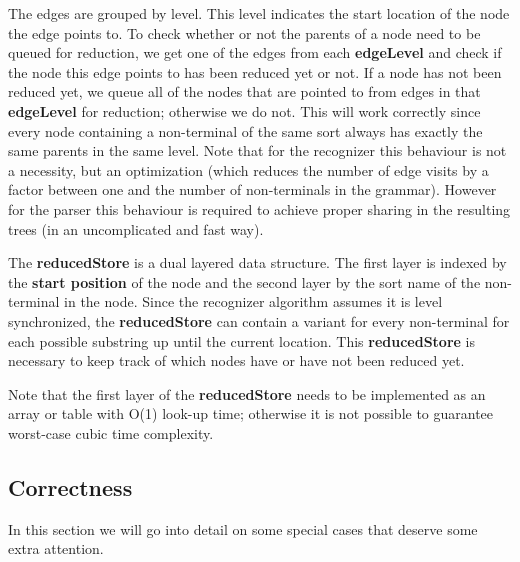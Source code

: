 \documentclass[a4paper,10pt]{article}
\begin{document}
The edges are grouped by level. This level indicates the start location of the node the edge points to. To check whether or not the parents of a node need to be queued for reduction, we get one of the edges from each {\bf edgeLevel} and check if the node this edge points to has been reduced yet or not. If a node has not been reduced yet, we queue all of the nodes that are pointed to from edges in that {\bf edgeLevel} for reduction; otherwise we do not. This will work correctly since every node containing a non-terminal of the same sort always has exactly the same parents in the same level. Note that for the recognizer this behaviour is not a necessity, but an optimization (which reduces the number of edge visits by a factor between one and the number of non-terminals in the grammar). However for the parser this behaviour is required to achieve proper sharing in the resulting trees (in an uncomplicated and fast way).

The {\bf reducedStore} is a dual layered data structure. The first layer is indexed by the {\bf start position} of the node and the second layer by the sort name of the non-terminal in the node. Since the recognizer algorithm assumes it is level synchronized, the {\bf reducedStore} can contain a variant for every non-terminal for each possible substring up until the current location. This {\bf reducedStore} is necessary to keep track of which nodes have or have not been reduced yet.

Note that the first layer of the {\bf reducedStore} needs to be implemented as an array or table with O(1) look-up time; otherwise it is not possible to guarantee worst-case cubic time complexity.

\subsection{Correctness}

In this section we will go into detail on some special cases that deserve some extra attention.
\end{document}
